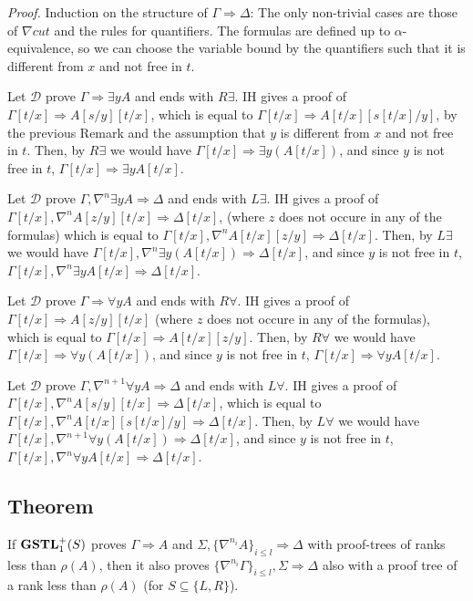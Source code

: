 \documentclass[a4paper, 12pt]{paper}
\begin{document}
\emph{Proof.} Induction on the structure of $\Gamma \Rightarrow \Delta$:
The only non-trivial cases are those of $\nabla cut$ and the rules for quantifiers. The formulas are defined up to $\alpha$-equivalence, so we can choose the variable bound by the quantifiers such that it is different from $x$ and not free in $t$.

Let $\mathcal{D}$ prove $\Gamma \Rightarrow \exists y A$ and ends with $R \exists$. IH gives a proof of $\Gamma[t/x] \Rightarrow A[s/y][t/x]$, which is equal to $\Gamma[t/x] \Rightarrow A[t/x][s[t/x]/y]$, by the previous Remark and the assumption that $y$ is different from $x$ and not free in $t$. Then, by $R \exists$ we would have $\Gamma[t/x] \Rightarrow \exists y (A[t/x])$, and since $y$ is not free in $t$, $\Gamma[t/x] \Rightarrow \exists y A [t/x]$.

Let $\mathcal{D}$ prove $\Gamma, \nabla^n \exists y A \Rightarrow \Delta$ and ends with $L \exists$. IH gives a proof of $\Gamma[t/x], \nabla^n A[z/y][t/x] \Rightarrow \Delta[t/x]$, (where $z$ does not occure in any of the formulas) which is equal to $\Gamma[t/x], \nabla^n A[t/x][z/y] \Rightarrow \Delta[t/x]$. Then, by $L \exists$ we would have $\Gamma[t/x], \nabla^n \exists y (A[t/x]) \Rightarrow \Delta[t/x]$, and since $y$ is not free in $t$, $\Gamma[t/x], \nabla^n \exists y A [t/x] \Rightarrow \Delta[t/x]$.

Let $\mathcal{D}$ prove $\Gamma \Rightarrow \forall y A$ and ends with $R \forall$. IH gives a proof of $\Gamma[t/x] \Rightarrow A[z/y][t/x]$ (where $z$ does not occure in any of the formulas), which is equal to $\Gamma[t/x] \Rightarrow A[t/x][z/y]$. Then, by $R \forall$ we would have $\Gamma[t/x] \Rightarrow \forall y (A[t/x])$, and since $y$ is not free in $t$, $\Gamma[t/x] \Rightarrow \forall y A [t/x]$.

Let $\mathcal{D}$ prove $\Gamma, \nabla^{n+1} \forall y A \Rightarrow \Delta$ and ends with $L \forall$. IH gives a proof of $\Gamma[t/x], \nabla^n A[s/y][t/x] \Rightarrow \Delta[t/x]$, which is equal to $\Gamma[t/x], \nabla^n A[t/x][s[t/x]/y] \Rightarrow \Delta[t/x]$. Then, by $L \forall$ we would have $\Gamma[t/x], \nabla^{n+1} \forall y (A[t/x]) \Rightarrow \Delta[t/x]$, and since $y$ is not free in $t$, $\Gamma[t/x], \nabla^n \forall y A [t/x] \Rightarrow \Delta[t/x]$.



\subsection{Theorem} If $\mathbf{GSTL}_1^+(S)$ proves $\Gamma \Rightarrow A$ and $\Sigma , \{\nabla^{n_i} A\}_{i \leq l} \Rightarrow \Delta$ with proof-trees of ranks less than $\rho(A)$, then it also proves $\{\nabla^{n_i} \Gamma\}_{i \leq l} , \Sigma \Rightarrow \Delta$ also with a proof tree of a rank less than $\rho(A)$ (for $S \subseteq \{ L, R \}$).
\end{document}
